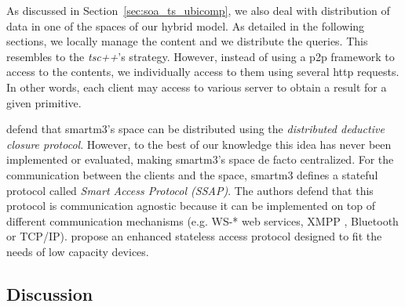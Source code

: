 As discussed in Section~\ref{sec:soa_ts_ubicomp}, we also deal with distribution of data in one of the spaces of our hybrid model.
As detailed in the following sections, we locally manage the content and we distribute the queries.
This resembles to the \emph{tsc++}'s strategy.
However, instead of using a \ac{p2p} framework to access to the contents,
we individually access to them using several \ac{http} requests. %
In other words, each client may access to various server to obtain a result for a given primitive.

\citet{honkola_smart-m3_2010} defend that \acs{smartm3}'s space can be distributed using the \emph{distributed deductive closure protocol}.
However, to the best of our knowledge this idea has never been implemented or evaluated, making \acs{smartm3}'s space de facto centralized.
For the communication between the clients and the space, \acs{smartm3} defines a stateful protocol called \emph{Smart Access Protocol (SSAP)}. %
The authors defend that this protocol is communication agnostic because it can be implemented on top of different communication mechanisms
(e.g. WS-* web services, XMPP , Bluetooth  or TCP/IP).
\citet{kiljander_knowledge_2012} propose an enhanced stateless access protocol designed to fit the needs of low capacity devices.





\subsection{Discussion}
\label{sec:soa_tsc_discussion}


